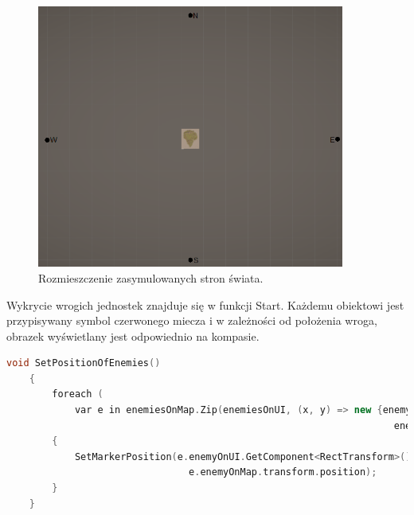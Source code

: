 \begin{figure}[htbp]
    \centering
    \includegraphics[width=0.9\textwidth]{images/ui/strony_swiata.png}
    \caption{Rozmieszczenie zasymulowanych stron świata.}\label{fig:world_sides}
\end{figure}
\FloatBarrier
Wykrycie wrogich jednostek znajduje się w funkcji Start. Każdemu obiektowi jest przypisywany symbol czerwonego miecza i w zależności od położenia wroga, obrazek wyświetlany jest odpowiednio na kompasie.
\begin{lstlisting}[language=C++, caption=Fragment kodu odpowiedzialny za połączenie wrogich obiektów na mapie z symbolami wyświetlonymi na kompasie.]
    void SetPositionOfEnemies()
    {
        foreach (
            var e in enemiesOnMap.Zip(enemiesOnUI, (x, y) => new {enemyOnMap = x, 
                                                                    enemyOnUI = y }))
        {
            SetMarkerPosition(e.enemyOnUI.GetComponent<RectTransform>(), 
                                e.enemyOnMap.transform.position);
        }
    }
\end{lstlisting}

